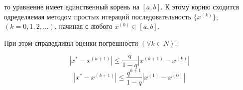 то уравнение имеет единственный корень на $[a, b]$. К этому корню
сходится одределяемая методом простых итераций последовательность
$\{x^{(k)}\}$, $(k=0,1,2,\dots)$, начиная с любого $x^{(0)}\in[a,b]$.

При этом справедливы оценки погрешности $(\forall k \in N)$:

$$|x^* - x^{(k+1)}|\leq\frac{q}{1-q}|x^{(k+1)}-x^{(k)}|$$
$$|x^* - x^{(k+1)}|\leq\frac{q^{k + 1}}{1-q}|x^{(1)}-x^{(0)}|$$


\pagebreak